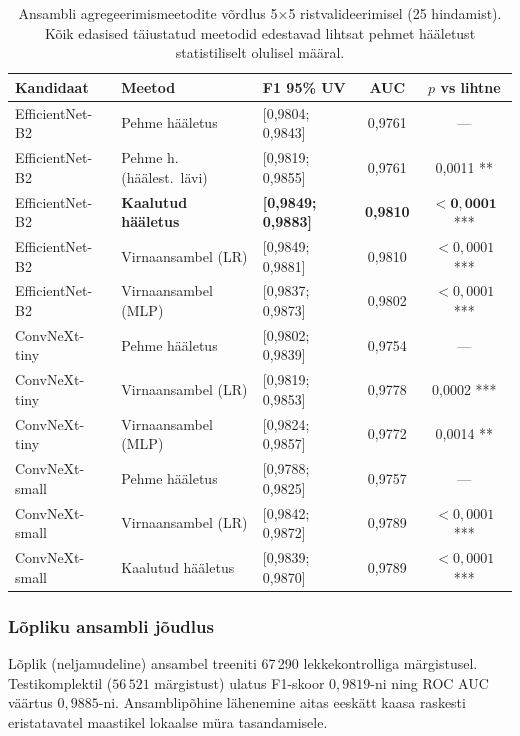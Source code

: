 \begin{table}[h!]
\centering
\caption{Ansambli agregeerimismeetodite võrdlus 5$\times$5 ristvalideerimisel (25 hindamist). Kõik edasised täiustatud meetodid edestavad lihtsat pehmet hääletust statistiliselt olulisel määral.}
\label{tab:ensemble-methods-comparison}
\begin{tabular}{lllcc}
\hline
\textbf{Kandidaat} & \textbf{Meetod} & \textbf{F1 95\% UV} & \textbf{AUC} & \textbf{$p$ vs lihtne} \\
\hline
EfficientNet-B2 & Pehme hääletus           & [0,9804; 0,9843] & 0,9761 & --- \\
EfficientNet-B2 & Pehme h. (häälest.~lävi) & [0,9819; 0,9855] & 0,9761 & 0,0011 ** \\
EfficientNet-B2 & \textbf{Kaalutud hääletus} & \textbf{[0,9849; 0,9883]} & \textbf{0,9810} & $\mathbf{<0{,}0001}$ *** \\
EfficientNet-B2 & Virnaansambel (LR)       & [0,9849; 0,9881] & 0,9810 & $<0{,}0001$ *** \\
EfficientNet-B2 & Virnaansambel (MLP)      & [0,9837; 0,9873] & 0,9802 & $<0{,}0001$ *** \\
\hline
ConvNeXt-tiny   & Pehme hääletus           & [0,9802; 0,9839] & 0,9754 & --- \\
ConvNeXt-tiny   & Virnaansambel (LR)       & [0,9819; 0,9853] & 0,9778 & 0,0002 *** \\
ConvNeXt-tiny   & Virnaansambel (MLP)      & [0,9824; 0,9857] & 0,9772 & 0,0014 ** \\
\hline
ConvNeXt-small  & Pehme hääletus           & [0,9788; 0,9825] & 0,9757 & --- \\
ConvNeXt-small  & Virnaansambel (LR)       & [0,9842; 0,9872] & 0,9789 & $<0{,}0001$ *** \\
ConvNeXt-small  & Kaalutud hääletus        & [0,9839; 0,9870] & 0,9789 & $<0{,}0001$ *** \\
\hline
\end{tabular}
\end{table}

\subsubsection{Lõpliku ansambli jõudlus}
\label{lopliku-ansambli-tulemused}

Lõplik (neljamudeline) ansambel treeniti 67\,290 lekkekontrolliga märgistusel. Testikomplektil ($56\,521$ märgistust) ulatus F1-skoor $0{,}9819$-ni ning ROC AUC väärtus $0{,}9885$-ni. Ansamblipõhine lähenemine aitas eeskätt kaasa raskesti eristatavatel maastikel lokaalse müra tasandamisele.

